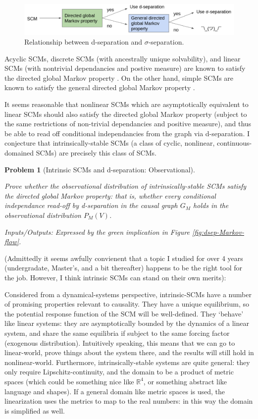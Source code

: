\documentclass[letterpaper,10pt]{article}
\newtheorem{problem}{Problem}
\newcommand\R{\mathbb{R}}
\begin{document}
\begin{figure}
\centering
\includegraphics[width=.8\linewidth]{pics/my_own/inputs_outputs.png}
\caption{Relationship between d-separation and $\sigma$-separation.}
\label{fig:inputs-outputs}
\end{figure}

Acyclic SCMs, discrete SCMs (with ancestrally unique solvability), and linear SCMs (with nontrivial dependancies and postive measure) are known to satisfy the directed global Markov property \cite{MarkovCyclesLatent}. On the other hand, simple SCMs are known to satisfy the general directed global Markov property \cite{Foundations}. 

It seems reasonable that nonlinear SCMs which are asymptotically equivalent to linear SCMs should also satisfy the directed global Markov property (subject to the same restrictions of non-trivial dependancies and positive measure), and thus be able to read off conditional independancies from the graph via d-separation.
I conjecture that intrinsically-stable SCMs (a class of cyclic, nonlinear, continuous-domained SCMs) are precisely this class of SCMs.

\begin{problem}[Intrinsic SCMs and d-separation: Observational]
\label{prob:obs}

Prove whether the observational distribution of intrinsically-stable SCMs satisfy the directed global Markov property: that is, whether every conditional independance read-off by d-separation in the causal graph $G_M$ holds in the observational distribution $P_M(V)$.

Inputs/Outputs: Expressed by the green implication in Figure \ref{fig:dsep-Markov-flow}.
\end{problem}

(Admittedly it seems awfully convienent that a topic I studied for over 4 years (undergradate, Master's, and a bit thereafter) happens to be the right tool for the job. However, I think intrinsic SCMs can stand on their own merits):

Considered from a dynamical-systems perspective, intrinsic-SCMs have a number of promising properties relevant to causality. They have a unique equilibrium, so the potential response function of the SCM will be well-defined. They `behave’ like linear systems: they are asymptotically bounded by the dynamics of a linear system, and share the same equilibria if subject to the same forcing factor (exogenous distribution). Intuitively speaking, this means that we can go to linear-world, prove things about the system there, and the results will still hold in nonlinear-world. Furthermore, intrinsically-stable systems are quite general: they only require Lipschitz-continuity, and the domain to be a product of metric spaces (which could be something nice like $\R^4$, or something abstract like language and shapes). If a general domain like metric spaces is used, the linearization uses the metrics to map to the real numbers: in this way the domain is simplified as well.
\end{document}
